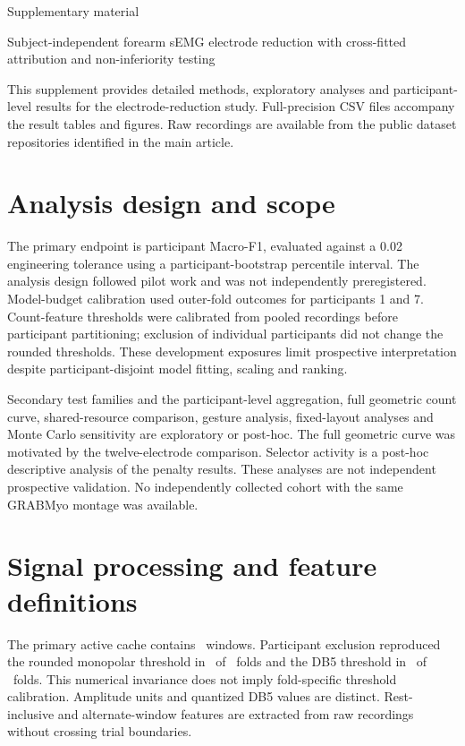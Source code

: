 \documentclass{iopjournal}
\begin{document}
{\noindent\fontsize{16}{19}\selectfont\sffamily Supplementary material\par}
\medskip
{\noindent\large Subject-independent forearm sEMG electrode reduction with cross-fitted attribution and non-inferiority testing\par}
\medskip
This supplement provides detailed methods, exploratory analyses and participant-level results for the electrode-reduction study. Full-precision CSV files accompany the result tables and figures. Raw recordings are available from the public dataset repositories identified in the main article.

\section{Analysis design and scope}
The primary endpoint is participant Macro-F1, evaluated against a 0.02 engineering tolerance using a participant-bootstrap percentile interval. The analysis design followed pilot work and was not independently preregistered. Model-budget calibration used outer-fold outcomes for participants 1 and 7. Count-feature thresholds were calibrated from pooled recordings before participant partitioning; exclusion of individual participants did not change the rounded thresholds. These development exposures limit prospective interpretation despite participant-disjoint model fitting, scaling and ranking.

Secondary test families and the participant-level aggregation, full geometric count curve, shared-resource comparison, gesture analysis, fixed-layout analyses and Monte Carlo sensitivity are exploratory or post-hoc. The full geometric curve was motivated by the twelve-electrode comparison. Selector activity is a post-hoc descriptive analysis of the penalty results. These analyses are not independent prospective validation. No independently collected cohort with the same GRABMyo montage was available.

\section{Signal processing and feature definitions}
The primary active cache contains \GRABMyoActiveWindows\ windows. Participant exclusion reproduced the rounded monopolar threshold in \LOOMonoIdentical\ of \LOOMonoFolds\ folds and the DB5 threshold in \LOODBFiveIdentical\ of \LOODBFiveFolds\ folds. This numerical invariance does not imply fold-specific threshold calibration. Amplitude units and quantized DB5 values are distinct. Rest-inclusive and alternate-window features are extracted from raw recordings without crossing trial boundaries.
\end{document}
